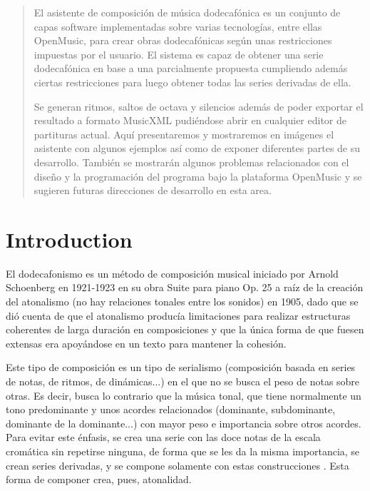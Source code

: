 \documentclass[12pt]{article}
\begin{document}
\maketitle

\begin{abstract}
El asistente de composición de música dodecafónica es un conjunto de capas software implementadas sobre varias tecnologías, entre ellas OpenMusic, para crear obras dodecafónicas según unas restricciones impuestas por el usuario. El sistema es capaz de obtener una serie dodecafónica en base a una parcialmente propuesta cumpliendo además ciertas restricciones para luego obtener todas las series derivadas de ella.

Se generan ritmos, saltos de octava y silencios además de poder exportar el resultado a formato MusicXML pudiéndose abrir en cualquier editor de partituras actual. Aquí presentaremos y mostraremos en imágenes el asistente con algunos ejemplos así como de exponer diferentes partes de su desarrollo. También se mostrarán algunos problemas relacionados con el diseño y la programación del programa bajo la plataforma OpenMusic y se sugieren futuras direcciones de desarrollo en esta area.
\end{abstract}

\section{Introduction}
El dodecafonismo es un método de composición musical iniciado por Arnold Schoenberg en 1921-1923 en su obra Suite para piano Op. 25 \cite{styleandidea} a raíz de la creación del atonalismo (no hay relaciones tonales entre los sonidos) en 1905, dado que se dió cuenta de que el atonalismo producía limitaciones para realizar estructuras coherentes de larga duración en composiciones y que la única forma de que fuesen extensas era apoyándose en un texto para mantener la cohesión. \cite{historiadelamusica}

Este tipo de composición es un tipo de serialismo (composición basada en series de notas, de ritmos, de dinámicas...) en el que no se busca el peso de notas sobre otras. Es decir, busca lo contrario que la música tonal, que tiene normalmente un tono predominante y unos acordes relacionados (dominante, subdominante, dominante de la dominante...) con mayor peso e importancia sobre otros acordes. Para evitar este énfasis, se crea una serie con las doce notas de la escala cromática  sin repetirse ninguna, de forma que se les da la misma importancia, se crean series derivadas, y se compone solamente con estas construcciones \cite{wiki:twelvetonetechnique}. Esta forma de componer crea, pues, atonalidad.
\end{document}
